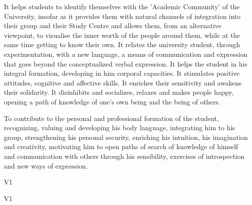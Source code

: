 \begin{syllabus}


\begin{justification}
	It helps students to identify themselves with the 'Academic Community' of the University, insofar as it provides them with natural channels of integration into their group and their Study Centre and allows them, from an alternative viewpoint, to visualise the inner worth of the people around them, while at the same time getting to know their own.
	It relates the university student, through experimentation, with a new language, a means of communication and expression that goes beyond the conceptualized verbal expression.
	It helps the student in his integral formation, developing in him corporal capacities. It stimulates positive attitudes, cognitive and affective skills. It enriches their sensitivity and awakens their solidarity.
	It disinhibits and socializes, relaxes and makes people happy, opening a path of knowledge of one's own being and the being of others.
\end{justification}

\begin{goals}
\item To contribute to the personal and professional formation of the student, recognizing, valuing and developing his body language, integrating him to his group, strengthening his personal security, enriching his intuition, his imagination and creativity, motivating him to open paths of search of knowledge of himself and communication with others through his sensibility, exercises of introspection and new ways of expression.
\end{goals}

\begin{outcomes}{V1}
    \item {}
	\item {}
    \item {}
\end{outcomes}

\begin{specificoutcomes}{V1}
	\item {}
    \item {}
	\item {}
	\item {}
    \item {}
    \item {}
    \item {}
\end{specificoutcomes}


\end{syllabus}
